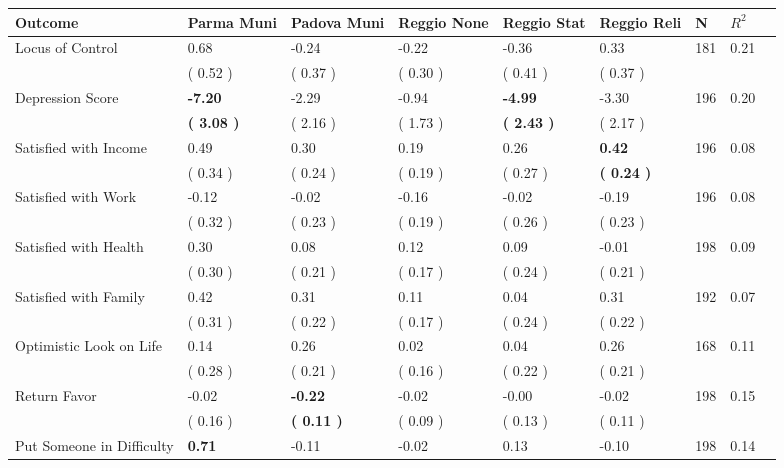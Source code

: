 \begin{tabular}{L{6.2cm} C{1.8cm} C{1.8cm} C{1.8cm} C{1.8cm} C{1.8cm} C{1.8cm} C{0.3cm} C{0.3cm}}
\toprule
 \textbf{Outcome} & \textbf{Parma Muni} & \textbf{Padova Muni} & \textbf{Reggio None} & \textbf{Reggio Stat} & \textbf{Reggio Reli} & \textbf{N} & \textbf{$ R^2$} \\
\midrule
Locus of Control &      0.68 &     -0.24 &     -0.22 &     -0.36 &      0.33  & 181 &       0.21 \\ 
 & (     0.52 ) & (     0.37 ) & (     0.30 ) & (     0.41 ) & (     0.37 )  & \\
Depression Score & \textbf{    -7.20} &     -2.29 &     -0.94 & \textbf{    -4.99} &     -3.30  & 196 &       0.20 \\ 
 & \textbf{(     3.08 )} & (     2.16 ) & (     1.73 ) & \textbf{(     2.43 )} & (     2.17 )  & \\
Satisfied with Income &      0.49 &      0.30 &      0.19 &      0.26 & \textbf{     0.42}  & 196 &       0.08 \\ 
 & (     0.34 ) & (     0.24 ) & (     0.19 ) & (     0.27 ) & \textbf{(     0.24 )}  & \\
Satisfied with Work &     -0.12 &     -0.02 &     -0.16 &     -0.02 &     -0.19  & 196 &       0.08 \\ 
 & (     0.32 ) & (     0.23 ) & (     0.19 ) & (     0.26 ) & (     0.23 )  & \\
Satisfied with Health &      0.30 &      0.08 &      0.12 &      0.09 &     -0.01  & 198 &       0.09 \\ 
 & (     0.30 ) & (     0.21 ) & (     0.17 ) & (     0.24 ) & (     0.21 )  & \\
Satisfied with Family &      0.42 &      0.31 &      0.11 &      0.04 &      0.31  & 192 &       0.07 \\ 
 & (     0.31 ) & (     0.22 ) & (     0.17 ) & (     0.24 ) & (     0.22 )  & \\
Optimistic Look on Life &      0.14 &      0.26 &      0.02 &      0.04 &      0.26  & 168 &       0.11 \\ 
 & (     0.28 ) & (     0.21 ) & (     0.16 ) & (     0.22 ) & (     0.21 )  & \\
Return Favor &     -0.02 & \textbf{    -0.22} &     -0.02 &     -0.00 &     -0.02  & 198 &       0.15 \\ 
 & (     0.16 ) & \textbf{(     0.11 )} & (     0.09 ) & (     0.13 ) & (     0.11 )  & \\
Put Someone in Difficulty & \textbf{     0.71} &     -0.11 &     -0.02 &      0.13 &     -0.10  & 198 &       0.14 \\ 

\end{tabular}

